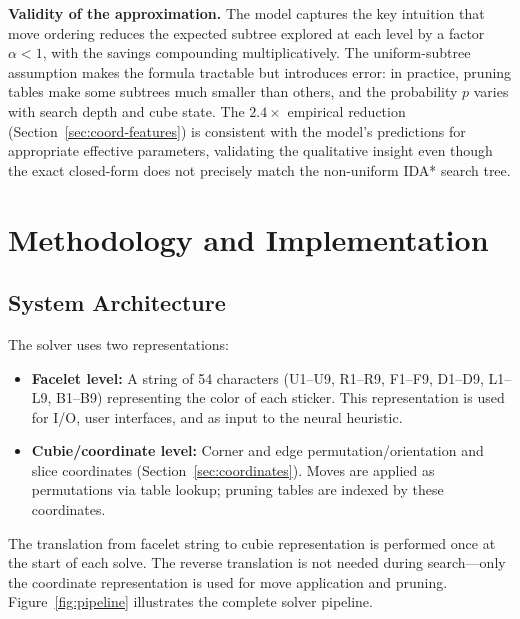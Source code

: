 \documentclass[conference]{IEEEtran}
\begin{document}
\textbf{Validity of the approximation.} The model captures the key intuition that move ordering reduces the expected subtree explored at each level by a factor $\alpha < 1$, with the savings compounding multiplicatively. The uniform-subtree assumption makes the formula tractable but introduces error: in practice, pruning tables make some subtrees much smaller than others, and the probability $p$ varies with search depth and cube state. The $2.4{\times}$ empirical reduction (Section~\ref{sec:coord-features}) is consistent with the model's predictions for appropriate effective parameters, validating the qualitative insight even though the exact closed-form does not precisely match the non-uniform IDA* search tree.

\section{Methodology and Implementation}
\label{sec:method}

\subsection{System Architecture}
The solver uses two representations:
\begin{itemize}[leftmargin=*]
  \item \textbf{Facelet level:} A string of 54 characters (U1--U9, R1--R9, F1--F9, D1--D9, L1--L9, B1--B9) representing the color of each sticker. This representation is used for I/O, user interfaces, and as input to the neural heuristic.
  \item \textbf{Cubie/coordinate level:} Corner and edge permutation/orientation and slice coordinates (Section~\ref{sec:coordinates}). Moves are applied as permutations via table lookup; pruning tables are indexed by these coordinates.
\end{itemize}

The translation from facelet string to cubie representation is performed once at the start of each solve. The reverse translation is not needed during search---only the coordinate representation is used for move application and pruning. Figure~\ref{fig:pipeline} illustrates the complete solver pipeline.
\end{document}
